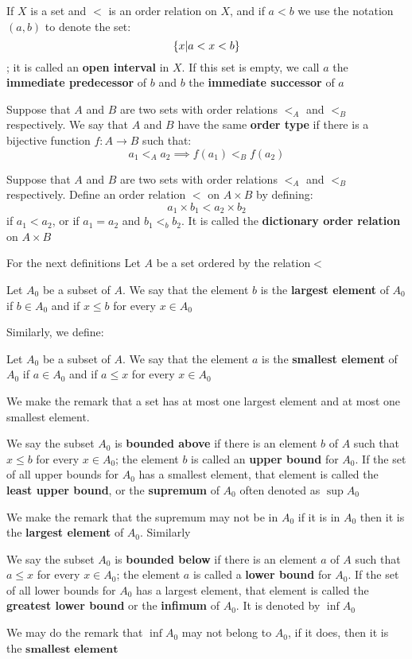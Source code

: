 \begin{defn}
	If $ X $ is a set and $ < $ is an order relation on $ X $, and if $ a < b $ we use the notation $ (a,b) $ to denote the set:
	\[ \left\lbrace x| a < x < b \right\rbrace \];
	it is called an \textbf{open interval } in $ X $. If this set is empty, we call $ a $ the \textbf{immediate predecessor } of $ b $ and $ b $ the \textbf{immediate successor} of $ a $
\end{defn}
\begin{defn}
	Suppose that $ A $ and $ B $ are two sets with order relations $ <_A $ and $ <_B $respectively. We say that $ A $ and $ B $ have the same \textbf{order type} if there is a bijective function $ f: A \rightarrow B $ such that:
	\[ a_1 <_A a_2 \implies f(a_1) <_B f(a_2) \]
\end{defn}
\begin{defn}
	Suppose that $ A $ and $ B $ are two sets with order relations $ <_A $ and $ <_B $ respectively. Define an order relation $ < $ on $ A \times B $ by defining:
	\[ a_1 \times b_1 < a_2 \times b_2 \]
	if $ a_1 < a_2 $, or if $ a_1 = a_2  $ and $ b_1 <_b b_2 $. It is called the \textbf{dictionary order relation} on $ A \times B $
\end{defn}
For the next definitions Let $ A $ be a set ordered by the relation$ < $
\begin{define}
	Let $ A_0 $ be a subset of $ A $. We say that the element $ b $ is the \textbf{largest element} of $ A_0 $ if $ b \in A_0 $ and if $ x \leq b $ for every $ x \in A_0 $
\end{define}
Similarly, we define:
\begin{defn}
	Let $ A_0 $ be a subset of $ A $. We say that the element $ a $ is the \textbf{smallest element} of $ A_0 $ if $ a \in A_0 $ and if $  a \leq x $ for every $ x \in A_0 $
\end{defn}
We make the remark that a set has at most one largest element and at most one smallest element.

\begin{define}
	We say the subset $ A_0 $ is \textbf{bounded above } if there is an element $ b $ of $ A $ such that $ x \leq b $ for every $ x \in A_0 $; the element $ b $ is called an \textbf{upper bound} for $ A_0 $. If the set of all upper bounds for $ A_0 $ has a smallest element, that element is called the \textbf{least upper bound}, or the \textbf{supremum} of $ A_0 $ often denoted as $ \sup A_0 $
\end{define}
We make the remark that the supremum may not be in $ A_0 $ if it is in $ A_0 $ then it is the \textbf{largest element} of $ A_0 $.
Similarly
\begin{define}
	We say the subset $ A_0 $ is \textbf{bounded below} if there is an element $ a $ of $ A $ such that $ a \leq x $ for every $ x \in A_0 $; the element $ a $ is called a \textbf{lower bound} for $ A_0 $. If the set of all lower bounds for $ A_0 $ has a largest element, that element is called the \textbf{greatest lower bound} or the \textbf{infimum} of $ A_0 $. It is denoted by $ \inf A_0  $
\end{define}
We may do the remark that $ \inf A_0 $ may not belong to $ A_0 $, if it does, then it is the $ \textbf{smallest element} $

